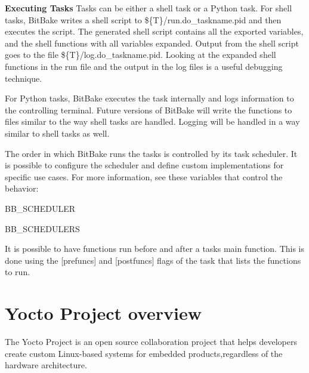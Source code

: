 \begin{DoxyItemize}
\item {\bfseries Executing Tasks} Tasks can be either a shell task or a Python task. For shell tasks, Bit\+Bake writes a shell script to \$\{T\}/run.do\+\_\+taskname.\+pid and then executes the script. The generated shell script contains all the exported variables, and the shell functions with all variables expanded. Output from the shell script goes to the file \$\{T\}/log.do\+\_\+taskname.\+pid. Looking at the expanded shell functions in the run file and the output in the log files is a useful debugging technique.

For Python tasks, Bit\+Bake executes the task internally and logs information to the controlling terminal. Future versions of Bit\+Bake will write the functions to files similar to the way shell tasks are handled. Logging will be handled in a way similar to shell tasks as well.

The order in which Bit\+Bake runs the tasks is controlled by its task scheduler. It is possible to configure the scheduler and define custom implementations for specific use cases. For more information, see these variables that control the behavior\+:
\begin{DoxyItemize}
\item B\+B\+\_\+\+S\+C\+H\+E\+D\+U\+L\+ER
\item B\+B\+\_\+\+S\+C\+H\+E\+D\+U\+L\+E\+RS
\end{DoxyItemize}

It is possible to have functions run before and after a task\textquotesingle{}s main function. This is done using the \mbox{[}prefuncs\mbox{]} and \mbox{[}postfuncs\mbox{]} flags of the task that lists the functions to run. 
\end{DoxyItemize}\hypertarget{yocto_intro}{}\section{Yocto Project overview}\label{yocto_intro}
The Yocto Project is an open source collaboration project that helps developers create custom Linux-\/based systems for embedded products,regardless of the hardware architecture.
